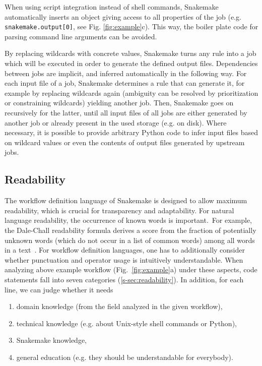 \documentclass[parskip=half]{scrartcl}
\begin{document}
When using script integration instead of shell commands, Snakemake automatically inserts an object giving access to all properties of the job (e.g. \lstinline!snakemake.output[0]!, see Fig.
\ref{fig:example}c).
This way, the boiler plate code for parsing command line arguments can be avoided.

By replacing wildcards with concrete values, Snakemake turns any rule into a job which will be executed in order to generate the defined output files.
Dependencies between jobs are implicit, and inferred automatically in the following way.
For each input file of a job, Snakemake determines a rule that can generate it, for example by replacing wildcards again (ambiguity can be resolved by prioritization or constraining wildcards) yielding another job.
Then, Snakemake goes on recursively for the latter, until all input files of all jobs are either generated by another job or already present in the used storage (e.g. on disk).
Where necessary, it is possible to provide arbitrary Python code to infer input files based on wildcard values or even the contents of output files generated by upstream jobs.

\subsection{Readability}

The workflow definition language of Snakemake is designed to allow maximum readability, which is crucial for transparency and adaptability.
For natural language readability, the occurrence of known words is important.~For example, the Dale-Chall readability formula derives a score from the fraction of potentially unknown words (which do not occur in a list of common words) among all words in a text~\parencite{chall_readability_1995}.
For workflow definition languages, one has to additionally consider whether punctuation and operator usage is intuitively understandable.
When analyzing above example workflow (Fig.~\ref{fig:example}a) under these aspects, code statements fall into seven categories (\autoref{s-sec:readability}).
In addition, for each line, we can judge whether it needs 

\begin{enumerate}
	\item domain knowledge (from the field analyzed in the given workflow),
	\item technical knowledge (e.g. about Unix-style shell commands or Python),
	\item Snakemake knowledge,
	\item general education (e.g. they should be understandable for everybody).
\end{enumerate}
\end{document}
